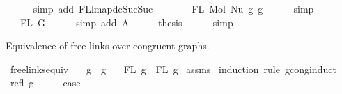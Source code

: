 \begin{isabellebody}
\ \ \ \ \isamarkupfalse%
\ {\isacharparenleft}{\kern0pt}simp\ add{\isacharcolon}{\kern0pt}\ FL{\isacharunderscore}{\kern0pt}lmap{\isacharunderscore}{\kern0pt}deSuc{\isacharunderscore}{\kern0pt}Suc{\isacharparenright}{\kern0pt}\isanewline
\ \ \isamarkupfalse%
\ \isamarkupfalse%
\ {\isachardoublequoteopen}{\isachardot}{\kern0pt}{\isachardot}{\kern0pt}{\isachardot}{\kern0pt}\ {\isacharequal}{\kern0pt}\ FL\ {\isacharparenleft}{\kern0pt}Mol\ {\isacharparenleft}{\kern0pt}Nu\ g{}{\isacharparenright}{\kern0pt}\ g{}{\isacharparenright}{\kern0pt}{\isachardoublequoteclose}\isanewline
\ \ \ \ \isamarkupfalse%
\ simp\isanewline
\ \ \isamarkupfalse%
\ \isamarkupfalse%
\ {\isachardoublequoteopen}{\isachardot}{\kern0pt}{\isachardot}{\kern0pt}{\isachardot}{\kern0pt}\ {\isacharequal}{\kern0pt}\ FL\ G{}{\isachardoublequoteclose}\isanewline
\ \ \ \ \isamarkupfalse%
\ {\isacharparenleft}{\kern0pt}simp\ add{\isacharcolon}{\kern0pt}\ A{}{\isacharparenright}{\kern0pt}\isanewline
\ \ \isamarkupfalse%
\ \isamarkupfalse%
\ {\isacharquery}{\kern0pt}thesis\isanewline
\ \ \ \ \isamarkupfalse%
\ simp\isanewline
{}\isamarkupfalse%
%
\endisatagproof
{\isafoldproof}%
%
\isadelimproof
%
\endisadelimproof
%
\begin{isamarkuptext}%
Equivalence of free links over congruent graphs.%
\end{isamarkuptext}\isamarkuptrue%
\isamarkupfalse%
\ freelinks{\isacharunderscore}{\kern0pt}equiv{\isacharcolon}{\kern0pt}\isanewline
\ \ \ {\isachardoublequoteopen}g{}\ {\isasymsimeq}\ g{}{\isachardoublequoteclose}\isanewline
\ \ \ {\isachardoublequoteopen}FL\ g{}\ {\isacharequal}{\kern0pt}\ FL\ g{}{\isachardoublequoteclose}\isanewline
%
\isadelimproof
%
\endisadelimproof
%
\isatagproof
{}\isamarkupfalse%
\ assms\isanewline
{}\isamarkupfalse%
\ {\isacharparenleft}{\kern0pt}induction\ rule{\isacharcolon}{\kern0pt}\ gcong{\isachardot}{\kern0pt}induct{\isacharparenright}{\kern0pt}\isanewline
\ \ \isamarkupfalse%
\ {\isacharparenleft}{\kern0pt}refl\ g{\isacharparenright}{\kern0pt}\isanewline
\ \ \isamarkupfalse%
\ \isamarkupfalse%
\ {\isacharquery}{\kern0pt}case\ \isamarkupfalse%

\end{isabellebody}
